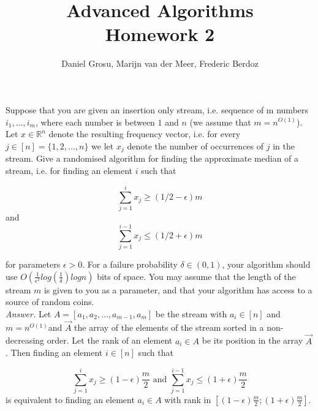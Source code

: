 \documentclass[10pt,usenames,dvipsnames]{article}
\newenvironment{exercise}[2][Exercise]{\begin{trivlist}
  \item[\hskip \labelsep {\bfseries #1}\hskip \labelsep {\bfseries #2.}]}{\end{trivlist}}
\begin{document}
	
  \renewcommand{\qedsymbol}{\smiley}
	\title{Advanced Algorithms \\ Homework 2
	}
	\author{Daniel Grosu, Marijn van der Meer, Frederic Berdoz}
	
	\maketitle

  \begin{exercise}{1} Suppose that you are given an insertion only stream, i.e. sequence of m numbers
$i_1,...,i_m$, where each number is between $1$ and $n$ (we assume that $m = n^{O(1)}$). Let $x \in \mathbb{R}^n$
denote the resulting frequency vector, i.e. for every $j \in [n] = \{1,2,...,n\}$ we let $x_j$ denote the
number of occurrences of $j$ in the stream.
Give a randomised algorithm for finding the approximate median of a stream, i.e. for finding
an element $i$ such that

\begin{equation*}
    \sum_{j = 1}^{i}x_j \geq (1/2-\epsilon)m
\end{equation*}
and
\begin{equation*}
    \sum_{j = 1}^{i-1}x_j \leq (1/2+\epsilon)m
\end{equation*}
 
 for parameters $\epsilon > 0$. For a failure probability $\delta \in (0,1)$,
 your algorithm should use $O(\frac{1}{\epsilon^2}log \left( \frac{1}{\delta}
 \right)logn)$ bits of space. You may assume that the length of the stream $m$
 is given to you as a 
parameter, and that your algorithm has access to a source of random coins. \\
  \textit{Answer.}
    Let $A = [a_1, a_2, \ldots, a_{m-1}, a_m]$ be the stream with
    $a_i \in \left[ n \right]$ and $m = n^{O(1)}$and $\overrightarrow{A}$ the array of the elements of the stream sorted
    in a non-decreasing order. Let the rank of an element
    $a_i \in A$ be its position in the array $ \overrightarrow{A}$. Then finding an element $i \in [n]$ such that

    \begin{equation}
      \sum_{j = 1}^i x_j \geq (1 - \epsilon)\frac{m}{2} \text{ and }  \sum_{j =
        1}^{i-1} x_j \leq (1 + \epsilon)\frac{m}{2} 
    \end{equation}
    is equivalent to finding an element $a_i \in A$ with rank in $ \left[ (1
      - \epsilon)\frac{m}{2}; (1 + \epsilon)\frac{m}{2} \right]$. 


\end{exercise}
\end{document}
